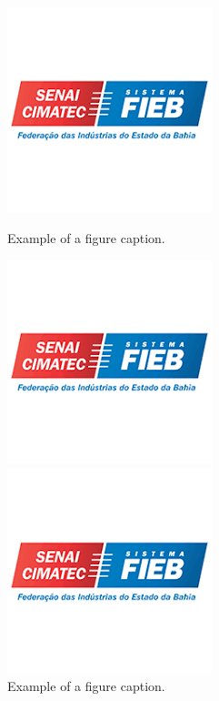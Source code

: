 \begin{figure}[H]
\begin{minipage}{.5\textwidth}
      \includegraphics[width=0.5\linewidth, height=0.15\textheight]{images/fig-senai.png}
      \caption{Example of a figure caption.}
      \label{fig:prob1_6_2}
  \end{minipage}%
  \begin{minipage}{0.5\textwidth}
      \centering
      \includegraphics[width=0.5\linewidth, height=0.15\textheight]{images/fig-senai.png}
      \caption{Example of a figure caption.}
      \label{fig:prob1_6_1}
   \end{minipage}
   \begin{minipage}{.5\textwidth}
      \centering
      \includegraphics[width=0.5\linewidth, height=0.15\textheight]{images/fig-senai.png}

\end{minipage}
\end{figure}
